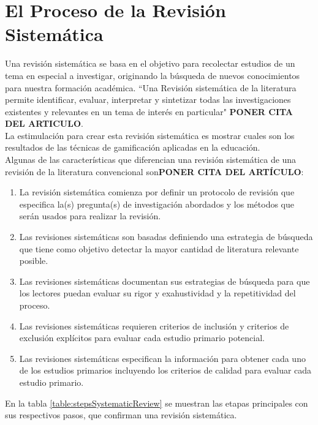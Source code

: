 \documentclass[•]{article}
\begin{document}
\section{El Proceso de la Revisión Sistemática}
Una revisión sistemática se basa en el objetivo para recolectar estudios de un tema en especial a investigar, originando la búsqueda de nuevos conocimientos para nuestra formación académica. ``Una Revisión sistemática de la literatura permite identificar, evaluar, interpretar y sintetizar todas las investigaciones existentes y relevantes en un tema de interés en particular" \textbf{PONER CITA DEL ARTICULO}.\\
La estimulación para crear esta revisión sistemática es mostrar cuales son los resultados de las técnicas de gamificación aplicadas en la educación.\\
Algunas de las características que diferencian una revisión sistemática de una revisión de la literatura convencional son\textbf{PONER CITA DEL ARTÍCULO}:
\begin{enumerate}
	\item La revisión sistemática comienza por definir un protocolo de revisión que especifica la(s) pregunta(s) de investigación abordados y los métodos que serán usados para realizar la revisión.
	\item Las revisiones sistemáticas son basadas definiendo una estrategia de búsqueda que tiene como objetivo detectar la mayor cantidad de literatura relevante posible.
	\item Las revisiones sistemáticas documentan sus estrategias de búsqueda para que los lectores puedan evaluar su rigor y exahustividad y la repetitividad del proceso.
	\item Las revisiones sistemáticas requieren criterios de inclusión y criterios de exclusión explícitos para evaluar cada estudio primario potencial.
	\item Las revisiones sistemáticas especifican la información para obtener cada uno de los estudios primarios incluyendo los criterios de calidad para evaluar cada estudio primario.
\end{enumerate}
En la tabla \ref{table:stepsSystematicReview} se muestran las etapas principales con sus respectivos pasos, que confirman una revisión sistemática.
\end{document}
